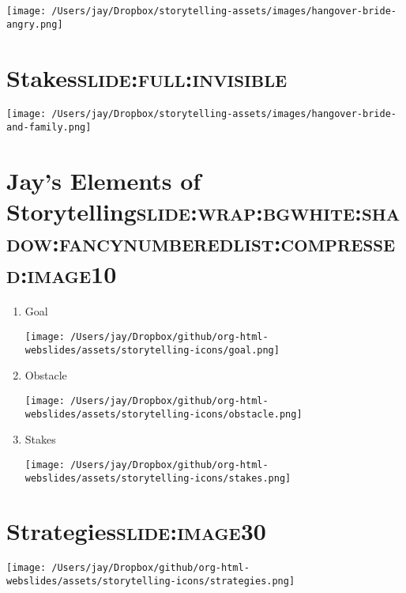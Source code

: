 \documentclass[12pt]{article}
\begin{document}
\begin{center}
\texttt{[image: /Users/jay/Dropbox/storytelling-assets/images/hangover-bride-angry.png]}
\end{center}


\section[Stakes]{Stakes\hfill{}\textsc{slide:full:invisible}}
\label{sec:org7cfe57d}

\begin{center}
\texttt{[image: /Users/jay/Dropbox/storytelling-assets/images/hangover-bride-and-family.png]}
\end{center}

\section[Jay's Elements of \textbf{Storytelling}]{Jay's Elements of \textbf{Storytelling}\hfill{}\textsc{slide:wrap:bgwhite:shadow:fancynumberedlist:compressed:image10}}
\label{sec:org9d3508b}

\begin{enumerate}
\item Goal \begin{center}
\texttt{[image: /Users/jay/Dropbox/github/org-html-webslides/assets/storytelling-icons/goal.png]}
\end{center}
\item Obstacle \begin{center}
\texttt{[image: /Users/jay/Dropbox/github/org-html-webslides/assets/storytelling-icons/obstacle.png]}
\end{center}
\item Stakes \begin{center}
\texttt{[image: /Users/jay/Dropbox/github/org-html-webslides/assets/storytelling-icons/stakes.png]}
\end{center}
\end{enumerate}

\section[Strategies]{Strategies\hfill{}\textsc{slide:image30}}
\label{sec:org3271ca3}
\begin{center}
\texttt{[image: /Users/jay/Dropbox/github/org-html-webslides/assets/storytelling-icons/strategies.png]}
\end{center}
\end{document}
